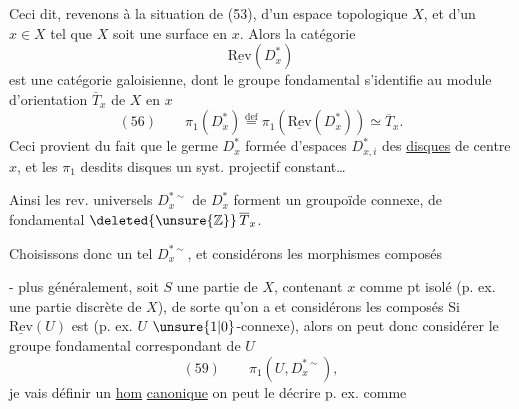 
Ceci dit, revenons à la situation de (53), d'un espace topologique $X$, et d'un $x\in X$ tel que $X$ soit une surface en $x$. Alors la catégorie 
\[
\underline{\mathrm{Rev}}(D_x^*)
\]
est une catégorie galoisienne,  dont le groupe fondamental s'identifie  au module d'orientation $\overline T_x$ de $X$ en $x$
\[
(56)\qquad \pi_1(D_x^*)\overset{\mathrm{def}}=\pi_1(\underline{\mathrm{Rev}}(D_x^*))\simeq\overline T_x.
\]
Ceci provient du fait que le germe $D_x^*$   formée d'espaces $D_{x,i}^*$   des \uline{disques} de centre $x$, et les $\pi_1$ desdits disques  un syst. projectif constant\ldots

Ainsi les rev. universels $D_x^{*\sim}$ de $D_x^*$ forment un groupoïde connexe, de  fondamental $\deleted{\unsure{\mathbb{Z}}}\,\overline T_x$.

Choisissons donc un tel $D_x^{*\sim}$, et considérons les morphismes composés

- plus généralement, soit $S$ une partie de $X$, contenant $x$ comme pt isolé (p. ex. une partie discrète de $X$), de sorte qu'on a
et considérons les composés
Si $\underline{\mathrm{Rev}}(U)$ est  (p. ex. $U$  $\unsure{1|0}$-connexe), alors on peut donc considérer le groupe fondamental correspondant de $U$
\[
(59)\qquad \pi_1(U,D_x^{*\sim}),
\]
je vais définir un \uline{hom} \uline{canonique}
on peut le décrire p. ex. comme

